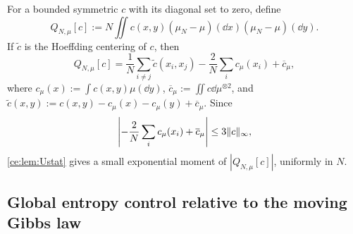 \documentclass[11pt,reqno]{amsart}
\numberwithin{equation}{section}
\theoremstyle{plain}
\theoremstyle{remark}
\DeclarePairedDelimiter{\norm}{\lVert}{\rVert}
\begin{document}
For a bounded symmetric $c$ with its diagonal set to zero, define
\begin{equation}\label{ce:eq:Qdefinition}
 Q_{N,\mu}[c]:=N\iint c(x,y)(\mu_N-\mu)(\dd x)(\mu_N-\mu)(\dd y).
\end{equation}
If $\widetilde c$ is the Hoeffding centering of $c$, then
\begin{equation}\label{ce:eq:Qcompletion}
 Q_{N,\mu}[c]=\frac1N\sum_{i\ne j}\widetilde c(x_i,x_j)
 -\frac2N\sum_i c_\mu(x_i)+\overline c_\mu,
\end{equation}
where $c_\mu(x):=\int c(x,y)\mu(\dd y)$, $\overline c_\mu:=\iint c\dd\mu^{\otimes2}$, and $\widetilde c(x,y):=c(x,y)-c_\mu(x)-c_\mu(y)+\overline c_\mu$. Since
\begin{equation}\label{ce:eq:Q-correction-bound}
 \left|-\frac2N\sum_i c_\mu(x_i)+\overline c_\mu\right|\le3\norm c_\infty,
\end{equation}
\cref{ce:lem:Ustat} gives a small exponential moment of $|Q_{N,\mu}[c]|$, uniformly in $N$.

\subsection{Global entropy control relative to the moving Gibbs law}\label{ce:sec:entropy}
\end{document}
